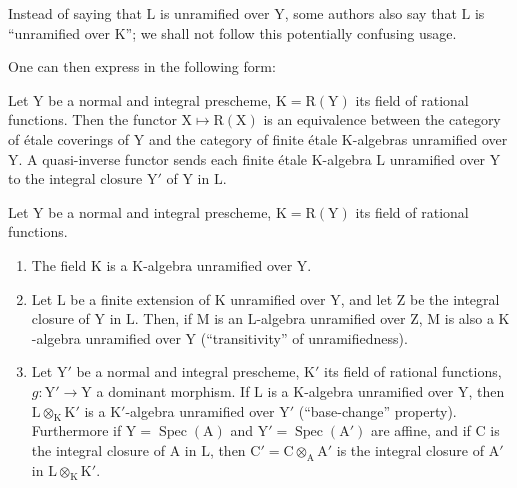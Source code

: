 \begin{remark}[18.10.11]
\label{IV.18.10.11}
Instead of saying that $\mathrm{L}$ is unramified over $\mathrm{Y}$, some authors also say that $\mathrm{L}$ is ``unramified over $\mathrm{K}$''; we shall not follow this potentially confusing usage.
\end{remark}

One can then express  in the following form:

\begin{corollary}[18.10.12]
\label{IV.18.10.12}
Let $\mathrm{Y}$ be a normal and integral prescheme, $\mathrm{K}=\mathrm{R}(\mathrm{Y})$ its field of rational functions.
Then the functor $\mathrm{X}\mapsto\mathrm{R}(\mathrm{X})$ is an equivalence between the category of \'etale coverings of $\mathrm{Y}$ and the category of finite \'etale $\mathrm{K}$-algebras unramified over $\mathrm{Y}$.
A quasi-inverse functor sends each finite \'etale $\mathrm{K}$-algebra $\mathrm{L}$ unramified over $\mathrm{Y}$ to the integral closure $\mathrm{Y}'$ of $\mathrm{Y}$ in $\mathrm{L}$.
\end{corollary}

\begin{proposition}[18.10.13]
\label{IV.18.10.13}
Let $\mathrm{Y}$ be a normal and integral prescheme, $\mathrm{K}=\mathrm{R}(\mathrm{Y})$ its field of rational functions.
\begin{enumerate}[label=(\roman*)]
  \item The field $\mathrm{K}$ is a $\mathrm{K}$-algebra unramified over $\mathrm{Y}$.
  \item Let $\mathrm{L}$ be a finite extension of $\mathrm{K}$ unramified over $\mathrm{Y}$, and let $\mathrm{Z}$ be the integral closure of $\mathrm{Y}$ in $\mathrm{L}$.
Then, if $\mathrm{M}$ is an $\mathrm{L}$-algebra unramified over $\mathrm{Z}$, $\mathrm{M}$ is also a $\mathrm{K}$-algebra unramified over $\mathrm{Y}$ (``transitivity'' of unramifiedness).
  \item Let $\mathrm{Y}'$ be a normal and integral prescheme, $\mathrm{K}'$ its field of rational functions, $g:\mathrm{Y}'\to\mathrm{Y}$ a dominant morphism.
If $\mathrm{L}$ is a $\mathrm{K}$-algebra unramified over $\mathrm{Y}$, then $\mathrm{L}\otimes_{\mathrm{K}}\mathrm{K}'$ is a $\mathrm{K}'$-algebra unramified over $\mathrm{Y}'$ (``base-change'' property).
Furthermore if $\mathrm{Y}=\operatorname{Spec}(\mathrm{A})$ and $\mathrm{Y}'=\operatorname{Spec}(\mathrm{A}')$ are affine, and if $\mathrm{C}$ is the integral closure of $\mathrm{A}$ in $\mathrm{L}$, then $\mathrm{C}'=\mathrm{C}\otimes_{\mathrm{A}}\mathrm{A}'$ is the integral closure of $\mathrm{A}'$ in $\mathrm{L}\otimes_{\mathrm{K}}\mathrm{K}'$.
\end{enumerate}
\end{proposition}

